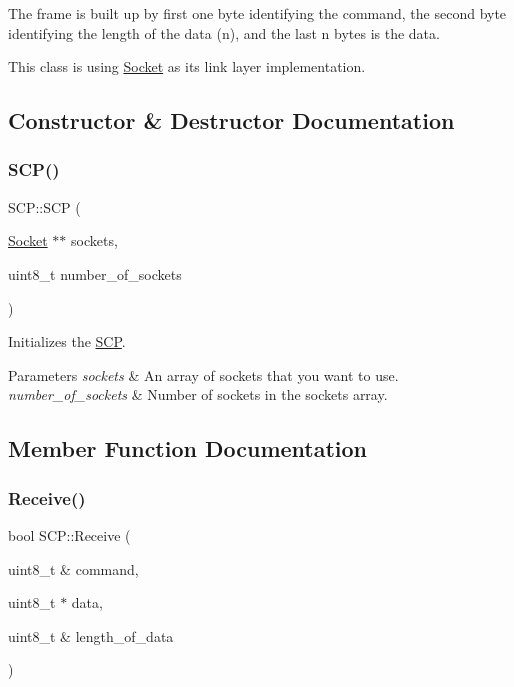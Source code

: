 The frame is built up by first one byte identifying the command, the second byte identifying the length of the data (n), and the last n bytes is the data.

This class is using \hyperlink{class_socket}{Socket} as its link layer implementation. 

\subsection{Constructor \& Destructor Documentation}
\hypertarget{class_s_c_p_aee0663a84b05a63993f1c3ff3a952319}{}\label{class_s_c_p_aee0663a84b05a63993f1c3ff3a952319} 
\subsubsection{\texorpdfstring{S\+C\+P()}{SCP()}}
{\footnotesize\ttfamily S\+C\+P\+::\+S\+CP (\begin{DoxyParamCaption}\item[{\hyperlink{class_socket}{Socket} $\ast$$\ast$}]{sockets,  }\item[{uint8\+\_\+t}]{number\+\_\+of\+\_\+sockets }\end{DoxyParamCaption})}

Initializes the \hyperlink{class_s_c_p}{S\+CP}. 
\begin{DoxyParams}{Parameters}
{\em sockets} & An array of sockets that you want to use. \\
\hline
{\em number\+\_\+of\+\_\+sockets} & Number of sockets in the sockets array. \\
\hline
\end{DoxyParams}


\subsection{Member Function Documentation}
\hypertarget{class_s_c_p_ab01a551b8edf803faaea5b0310345498}{}\label{class_s_c_p_ab01a551b8edf803faaea5b0310345498} 
\subsubsection{\texorpdfstring{Receive()}{Receive()}}
{\footnotesize\ttfamily bool S\+C\+P\+::\+Receive (\begin{DoxyParamCaption}\item[{uint8\+\_\+t \&}]{command,  }\item[{uint8\+\_\+t $\ast$}]{data,  }\item[{uint8\+\_\+t \&}]{length\+\_\+of\+\_\+data }\end{DoxyParamCaption})}

